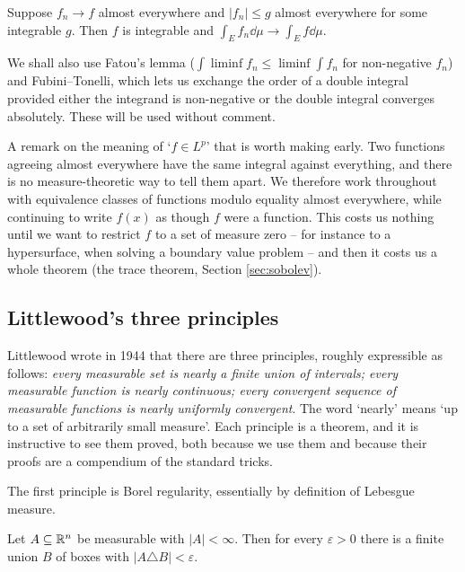 \documentclass[a4paper]{scrartcl}
\begin{document}
\begin{theorem}\label{thm:dct}
	Suppose $f_n \to f$ almost everywhere and $|f_n| \le g$ almost everywhere for some integrable $g$. Then $f$ is integrable and $\int_E f_n \dd \mu \to \int_E f \dd \mu$.
\end{theorem}

We shall also use Fatou's lemma ($\int \liminf f_n \le \liminf \int f_n$ for non-negative $f_n$) and Fubini--Tonelli, which lets us exchange the order of a double integral provided either the integrand is non-negative or the double integral converges absolutely. These will be used without comment.

\begin{remark}
	A remark on the meaning of `$f \in L^p$' that is worth making early. Two functions agreeing almost everywhere have the same integral against everything, and there is no measure-theoretic way to tell them apart. We therefore work throughout with equivalence classes of functions modulo equality almost everywhere, while continuing to write $f(x)$ as though $f$ were a function. This costs us nothing until we want to restrict $f$ to a set of measure zero -- for instance to a hypersurface, when solving a boundary value problem -- and then it costs us a whole theorem (the trace theorem, Section \ref{sec:sobolev}).
\end{remark}

\subsection{Littlewood's three principles}

Littlewood wrote in 1944 that there are three principles, roughly expressible as follows: \emph{every measurable set is nearly a finite union of intervals; every measurable function is nearly continuous; every convergent sequence of measurable functions is nearly uniformly convergent}. The word `nearly' means `up to a set of arbitrarily small measure'. Each principle is a theorem, and it is instructive to see them proved, both because we use them and because their proofs are a compendium of the standard tricks.

The first principle is Borel regularity, essentially by definition of Lebesgue measure.

\begin{proposition}\label{prop:littlewood1}
	Let $A \subseteq \mathbb{R}^n$ be measurable with $|A| < \infty$. Then for every $\varepsilon > 0$ there is a finite union $B$ of boxes with $|A \triangle B| < \varepsilon$.
\end{proposition}
\end{document}
